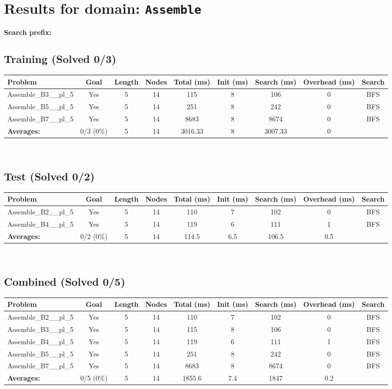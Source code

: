 \documentclass{article}
\begin{document}
\section*{Results for domain: \texttt{Assemble}}
\textbf{Search prefix:} 
\\[0.5cm]
\subsection*{Training (Solved 0/3)}
\begin{tabular}{lcccccccc}
\toprule
Problem & Goal & Length & Nodes & Total (ms) & Init (ms) & Search (ms) & Overhead (ms) & Search \\
\midrule
Assemble\_B3\_\_pl\_5 & Yes & 5 & 14 & 115 & 8 & 106 & 0 & BFS \\
Assemble\_B5\_\_pl\_5 & Yes & 5 & 14 & 251 & 8 & 242 & 0 & BFS \\
Assemble\_B7\_\_pl\_5 & Yes & 5 & 14 & 8683 & 8 & 8674 & 0 & BFS \\
\textbf{Averages:} & 0/3 (0\%) & 5 & 14 & 3016.33 & 8 & 3007.33 & 0 & \\
\bottomrule
\end{tabular}
\\[0.7cm]
\subsection*{Test (Solved 0/2)}
\begin{tabular}{lcccccccc}
\toprule
Problem & Goal & Length & Nodes & Total (ms) & Init (ms) & Search (ms) & Overhead (ms) & Search \\
\midrule
Assemble\_B2\_\_pl\_5 & Yes & 5 & 14 & 110 & 7 & 102 & 0 & BFS \\
Assemble\_B4\_\_pl\_5 & Yes & 5 & 14 & 119 & 6 & 111 & 1 & BFS \\
\textbf{Averages:} & 0/2 (0\%) & 5 & 14 & 114.5 & 6.5 & 106.5 & 0.5 & \\
\bottomrule
\end{tabular}
\\[0.7cm]
\subsection*{Combined (Solved 0/5)}
\begin{tabular}{lcccccccc}
\toprule
Problem & Goal & Length & Nodes & Total (ms) & Init (ms) & Search (ms) & Overhead (ms) & Search \\
\midrule
Assemble\_B2\_\_pl\_5 & Yes & 5 & 14 & 110 & 7 & 102 & 0 & BFS \\
Assemble\_B3\_\_pl\_5 & Yes & 5 & 14 & 115 & 8 & 106 & 0 & BFS \\
Assemble\_B4\_\_pl\_5 & Yes & 5 & 14 & 119 & 6 & 111 & 1 & BFS \\
Assemble\_B5\_\_pl\_5 & Yes & 5 & 14 & 251 & 8 & 242 & 0 & BFS \\
Assemble\_B7\_\_pl\_5 & Yes & 5 & 14 & 8683 & 8 & 8674 & 0 & BFS \\
\textbf{Averages:} & 0/5 (0\%) & 5 & 14 & 1855.6 & 7.4 & 1847 & 0.2 & \\
\bottomrule
\end{tabular}
\\[0.7cm]
\end{document}
